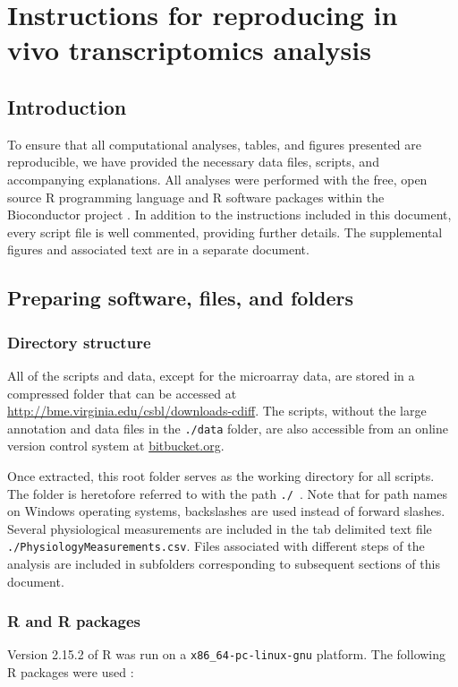 \chapter[Reproducing in vivo analyses]{Instructions for reproducing in vivo transcriptomics analysis}

\section{Introduction}\label{S:Intro}
To ensure that all computational analyses, tables, and figures
presented are reproducible, we have provided the necessary data
files, scripts, and accompanying explanations. All analyses 
were performed with the free, open source R programming language
and R software packages within the Bioconductor project \cite{Gentleman:2004tt}. 
In addition
to the instructions included in this document, every script file
is well commented, providing further details. The supplemental figures
and associated text are in a separate document. 

\section{Preparing software, files, and folders}\label{S:Files} 

\subsection{Directory structure}
All of the scripts and data, except for the microarray data, are stored 
in a compressed folder that can be accessed at
\url{http://bme.virginia.edu/csbl/downloads-cdiff}. The scripts,
without the large annotation and data files in the \texttt{./data} folder, 
are also accessible from an online version control system at 
\href{https://bitbucket.org/kdauria/cdiff}{bitbucket.org}.

Once extracted, this root folder serves as the working 
directory for all scripts. The folder is heretofore
referred to with the path \texttt{./}~. Note that for path
names on Windows operating systems, backslashes are used instead of
forward slashes. Several physiological measurements are
included in the tab delimited text file
\texttt{./PhysiologyMeasurements.csv}. Files associated with 
different steps of the analysis are included
in subfolders corresponding to subsequent sections of this document.

\subsection{R and R packages}
Version 2.15.2 of R was run on a \texttt{x86\_{}64-pc-linux-gnu} platform. 
The following R packages were 
used \cite{Gautier:2004kv,Bolstad:2003ia,Durinck:2009ki,Wickham:2009tn,Smyth:2005um,Wickham:2007tu} :

